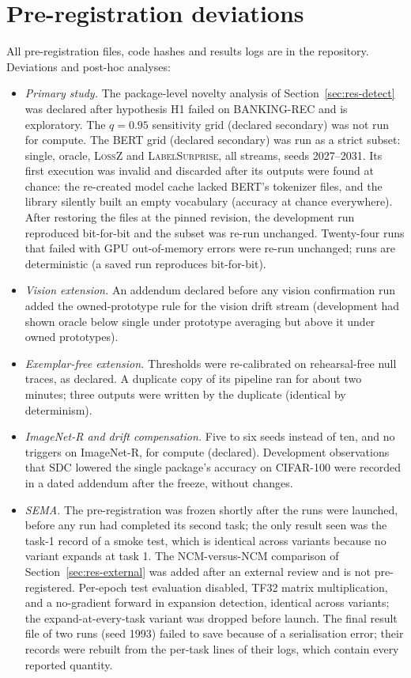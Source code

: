 \documentclass[10pt]{article}
\newcommand{\ls}{\textsc{LabelSurprise}}
\begin{document}
\section{Pre-registration deviations}
\label{app:deviations}
All pre-registration files, code hashes and results logs are in the repository. Deviations and post-hoc analyses:
\begin{itemize}
\item \emph{Primary study.} The package-level novelty analysis of Section~\ref{sec:res-detect} was declared after hypothesis H1 failed on BANKING-REC and is exploratory. The $q=0.95$ sensitivity grid (declared secondary) was not run for compute. The BERT grid (declared secondary) was run as a strict subset: single, oracle, \textsc{LossZ} and \ls{}, all streams, seeds 2027--2031. Its first execution was invalid and discarded after its outputs were found at chance: the re-created model cache lacked BERT's tokenizer files, and the library silently built an empty vocabulary (accuracy at chance everywhere). After restoring the files at the pinned revision, the development run reproduced bit-for-bit and the subset was re-run unchanged. Twenty-four runs that failed with GPU out-of-memory errors were re-run unchanged; runs are deterministic (a saved run reproduces bit-for-bit).
\item \emph{Vision extension.} An addendum declared before any vision confirmation run added the owned-prototype rule for the vision drift stream (development had shown oracle below single under prototype averaging but above it under owned prototypes).
\item \emph{Exemplar-free extension.} Thresholds were re-calibrated on rehearsal-free null traces, as declared. A duplicate copy of its pipeline ran for about two minutes; three outputs were written by the duplicate (identical by determinism).
\item \emph{ImageNet-R and drift compensation.} Five to six seeds instead of ten, and no triggers on ImageNet-R, for compute (declared). Development observations that \textsc{SDC} lowered the single package's accuracy on CIFAR-100 were recorded in a dated addendum after the freeze, without changes.
\item \emph{SEMA.} The pre-registration was frozen shortly after the runs were launched, before any run had completed its second task; the only result seen was the task-1 record of a smoke test, which is identical across variants because no variant expands at task 1. The NCM-versus-NCM comparison of Section~\ref{sec:res-external} was added after an external review and is not pre-registered. Per-epoch test evaluation disabled, TF32 matrix multiplication, and a no-gradient forward in expansion detection, identical across variants; the expand-at-every-task variant was dropped before launch. The final result file of two runs (seed 1993) failed to save because of a serialisation error; their records were rebuilt from the per-task lines of their logs, which contain every reported quantity.

\end{itemize}
\end{document}
